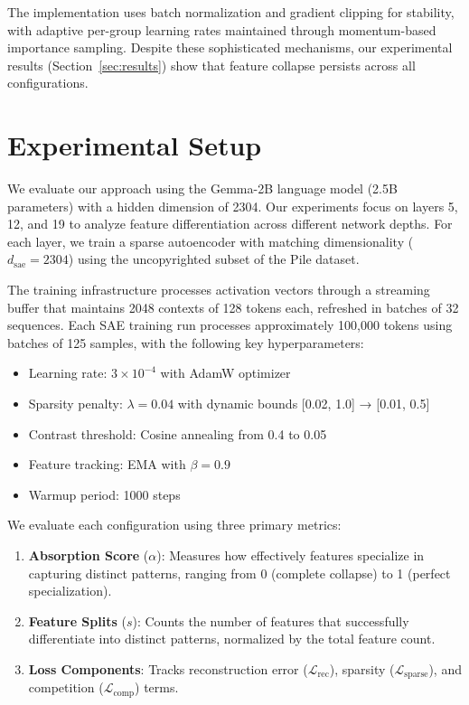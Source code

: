 \documentclass{article} %
\begin{document}
The implementation uses batch normalization and gradient clipping for stability, with adaptive per-group learning rates maintained through momentum-based importance sampling. Despite these sophisticated mechanisms, our experimental results (Section~\ref{sec:results}) show that feature collapse persists across all configurations.

\section{Experimental Setup}
\label{sec:experimental}

We evaluate our approach using the Gemma-2B language model (2.5B parameters) with a hidden dimension of 2304. Our experiments focus on layers 5, 12, and 19 to analyze feature differentiation across different network depths. For each layer, we train a sparse autoencoder with matching dimensionality ($d_{\text{sae}}=2304$) using the uncopyrighted subset of the Pile dataset.

The training infrastructure processes activation vectors through a streaming buffer that maintains 2048 contexts of 128 tokens each, refreshed in batches of 32 sequences. Each SAE training run processes approximately 100,000 tokens using batches of 125 samples, with the following key hyperparameters:

\begin{itemize}
    \item Learning rate: $3 \times 10^{-4}$ with AdamW optimizer \cite{loshchilov2017adamw}
    \item Sparsity penalty: $\lambda=0.04$ with dynamic bounds [0.02, 1.0] → [0.01, 0.5]
    \item Contrast threshold: Cosine annealing from 0.4 to 0.05
    \item Feature tracking: EMA with $\beta=0.9$
    \item Warmup period: 1000 steps
\end{itemize}

We evaluate each configuration using three primary metrics:
\begin{enumerate}
    \item \textbf{Absorption Score} ($\alpha$): Measures how effectively features specialize in capturing distinct patterns, ranging from 0 (complete collapse) to 1 (perfect specialization).
    \item \textbf{Feature Splits} ($s$): Counts the number of features that successfully differentiate into distinct patterns, normalized by the total feature count.
    \item \textbf{Loss Components}: Tracks reconstruction error ($\mathcal{L}_{\text{rec}}$), sparsity ($\mathcal{L}_{\text{sparse}}$), and competition ($\mathcal{L}_{\text{comp}}$) terms.
\end{enumerate}
\end{document}
